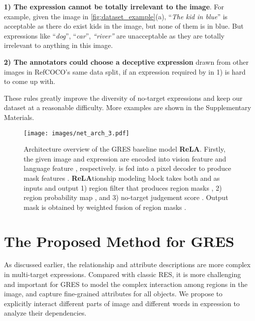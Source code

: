 \documentclass[10pt,twocolumn,letterpaper]{article}
\begin{document}
\noindent\textbf{1) The expression cannot be totally irrelevant to the image}. For example, given the image in \cref{fig:dataset_example}(a), ``\textit{The kid in blue}'' is acceptable as there do exist kids in the image, but none of them is in blue. But expressions like ``\textit{dog}'', ``\textit{car}'', \textit{``river''} \etc are unacceptable as they are totally irrelevant to anything in this image. 

\vspace{2pt}\noindent\textbf{2) The annotators could choose a deceptive expression} drawn from other images in RefCOCO's same data split, if an expression required by in 1) is hard to come up with.


These rules greatly improve the diversity of no-target expressions and keep our dataset at a reasonable difficulty. More examples are shown in the Supplementary Materials.

\begin{figure*}[t]
  \begin{center}
     \texttt{[image: images/net\_arch\_3.pdf]}
  \end{center}
 \vspace{-0.17in}
  \caption{Architecture overview of the GRES baseline model \textbf{ReLA}. Firstly, the given image and expression are encoded into vision feature  and language feature , respectively.  is fed into a pixel decoder to produce mask features . \textbf{ReLA}tionship modeling block takes both  and  as inputs and output 1) region filter  that produces region masks , 2) region probability map , and 3) no-target judgement score . Output mask is obtained by weighted fusion of region masks .}
  \vspace{-0.1in}
  \label{fig:net_arch}
\end{figure*}
\section{The Proposed Method for GRES}



As discussed earlier, the relationship and attribute descriptions are more complex in multi-target expressions. Compared with classic RES, it is more challenging and important for GRES to model the complex interaction among regions in the image, and capture fine-grained attributes for all objects. We propose to explicitly interact different parts of image and different words in expression to analyze their dependencies. 
\end{document}
